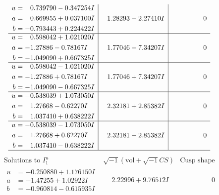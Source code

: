 \documentclass[1p]{elsarticle_modified}
\theoremstyle{definition}
\newcommand{\I}{\sqrt{-1}}
\begin{document}
$$\begin{array}{c|c|c}
\begin{aligned}
u &= \phantom{-}0.739790 - 0.347254 I \\
a &= \phantom{-}0.669955 + 0.037100 I \\
b &= -0.793443 + 0.224422 I\end{aligned}
 & \phantom{-}1.28293 - 2.27410 I & \phantom{-0.000000 } 0 \\ \hline\begin{aligned}
u &= \phantom{-}0.598042 + 1.021020 I \\
a &= -1.27886 - 0.78167 I \\
b &= -1.049090 + 0.667325 I\end{aligned}
 & \phantom{-}1.77046 - 7.34207 I & \phantom{-0.000000 } 0 \\ \hline\begin{aligned}
u &= \phantom{-}0.598042 - 1.021020 I \\
a &= -1.27886 + 0.78167 I \\
b &= -1.049090 - 0.667325 I\end{aligned}
 & \phantom{-}1.77046 + 7.34207 I & \phantom{-0.000000 } 0 \\ \hline\begin{aligned}
u &= -0.538039 + 1.073050 I \\
a &= \phantom{-}1.27668 - 0.62270 I \\
b &= \phantom{-}1.037410 + 0.638222 I\end{aligned}
 & \phantom{-}2.32181 + 2.85382 I & \phantom{-0.000000 } 0 \\ \hline\begin{aligned}
u &= -0.538039 - 1.073050 I \\
a &= \phantom{-}1.27668 + 0.62270 I \\
b &= \phantom{-}1.037410 - 0.638222 I\end{aligned}
 & \phantom{-}2.32181 - 2.85382 I & \phantom{-0.000000 } 0\\
 \hline 
 \end{array}$$\newpage$$\begin{array}{c|c|c}  
\text{Solutions to }I^u_{1}& \I (\text{vol} + \sqrt{-1}CS) & \text{Cusp shape}\\
 \hline 
\begin{aligned}
u &= -0.250880 + 1.176150 I \\
a &= -1.47255 + 1.02922 I \\
b &= -0.960814 - 0.615935 I\end{aligned}
 & \phantom{-}2.22996 + 9.76512 I & \phantom{-0.000000 } 0 \\ \hline\begin{aligned}

\end{aligned}
\end{array}$$
\end{document}
